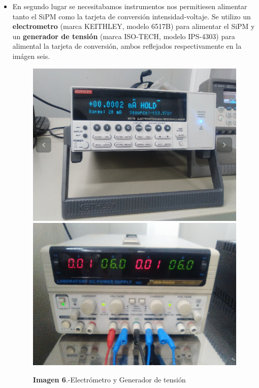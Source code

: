 \begin{itemize}
\item {} En segundo lugar se necesitabamos instrumentos nos permitiesen alimentar tanto el SiPM como la tarjeta de conversión intensidad-voltaje. Se utilizo  un \textbf{electrometro} (marca KEITHLEY, modelo 6517B) para alimentar el SiPM y un \textbf{generador de tensión} (marca ISO-TECH, modelo IPS-4303) para alimental la tarjeta de conversión, ambos reflejados respectivamente en la imágen seis.

\begin{figure}[htb]
\centering
{
\includegraphics[scale=0.2]{KEITHLEY.png} 
}
{
\includegraphics[scale=0.2]{ISO-TECH.png} 
}
\caption{\textbf{Imagen 6}.-Electrómetro y Generador de tensión}
\end{figure} 


\end{itemize}
